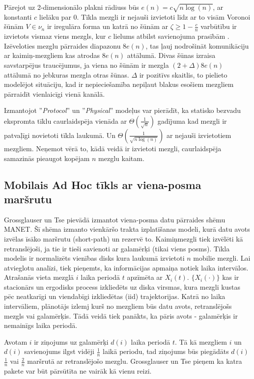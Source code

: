 Pārejot uz 2-dimensionālo plakni rādiuss būs $e(n) = c\sqrt{n\log(n)}$, ar konstanti $c$ lielāku par 0. Tīkla mezgli ir nejauši izvietoti līdz ar to visām Voronoi šūnām $V \in \nu_{n}$ ir iregulāra forma un katrā no šūnām ar $\zeta \geq 1-\frac{c}{n}$ varbūtību ir izvietots vismaz viens mezgls, kur $c$ lielums atbilst savienojuma prasībām \cite{gupta}. Izēveloties mezglu pārraides diapazonu $8e(n)$, tas ļauj nodrošināt komunikāciju ar kaimiņ-mezgliem kas atrodas $8e(n)$ attālumā. Divas šūnas izraisa savstarpējus traucējumus, ja viena no šūnām ir mezgla $(2+\Delta)8e(n)$ attālumā no jebkuras mezgla otras šūnas. $\Delta$ ir pozitīvs skaitlis, to pielieto modelējot situāciju, kad ir nepieciešamība nepiļaut blakus esošiem mezgliem pārraidīt vienlaicīgi vienā kanālā.

Izmantojot ''\textit{Protocol}'' un ''\textit{Physical}'' modeļus var pierādīt, ka statisko bezvadu ekspromta tīklu caurlaidspēja vienāda ar $\Theta({\frac{1}{\sqrt{n}}})$ gadījuma kad mezgli ir patvaļīgi novietoti tīkla laukumā. Un $\Theta(\frac{1}{\sqrt{n\log(n)}})$ ar nejauši izvietotiem mezgliem. Neņemot vērā to, kādā veidā ir izvietoti mezgli, caurlaidspēja samazinās pieaugot kopējam $n$ mezglu kaitam.


\subsection{Mobilais Ad Hoc tīkls ar viena-posma maršrutu}
Grossglauser un Tse \cite{grossglauser} pievādā izmantot viena-posma datu pārraides shēmu MANET. Šī shēma izmanto vienkāršo trakta izplatīšanas modeli, kurā datu avots izvēlas īsāko maršrutu (short-path) un rezervē to. Kaimiņmezgli tiek izvēlēti kā retranslējoši, ja tie ir tieši savienoti ar galamērķi (tikai viens posms). Tīkla modelis ir normalizēts vienības disks kura laukumā izvietoti $n$ mobilie mezgli. Lai atvieglotu analīzi, tiek pieņemts, ka informācijas apmaiņa notiek laika intervālos. Atrašanās vieta mezglā $i$ laika periodā $t$ apzīmēta ar $X_{i}(t)$. $\{X_{i}(\cdot)\}$ kas ir stacionārs un ergodisks process izkliedēts uz diska virsmas, kura mezgli kustas pēc neatkarīgi un viendabīgi izkliedētas (\acs{iid}) trajektorijas. Katrā no laika intervāliem, plānotājs izlemj kurš no mezgliem būs datu avots, retranslējošs mezgls vai galamērķis. Tādā veidā tiek panākts, ka pāris avots - galamērķis ir nemainīgs laika periodā.

Avotam $i$ ir ziņojums uz galamērķi $d(i)$ laika periodā $t$. Tā kā mezgliem $i$ un $d(i)$ savienojums ilgst vidēji $\frac{1}{n}$ laikā periodu, tad ziņojums būs piegādāts $d(i)$ $\frac{1}{n}$ vai $\frac{2}{n}$ maršrutā ar retranslējošo mezglu. Grossglauser un Tse pieņem ka katra pakete var būt pārsūtīta ne vairāk kā vienu reizi.

